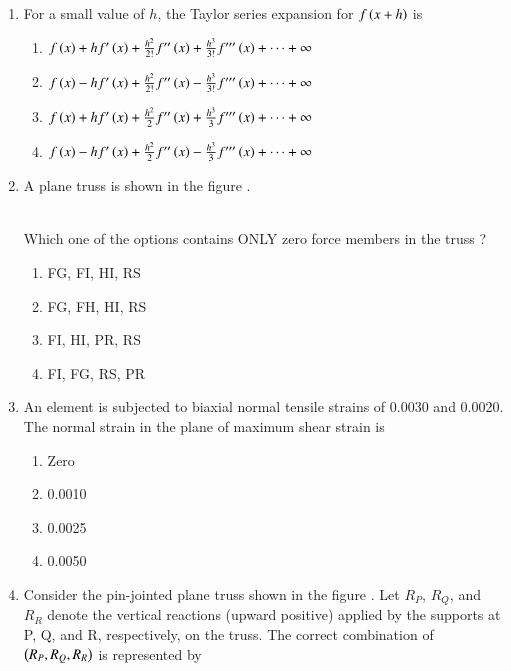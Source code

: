 \documentclass[journal]{IEEEtran}
\begin{document}
\begin{enumerate}
\item For a small value of $h$, the Taylor series expansion for $f\left(x+h\right)$ is
\begin{enumerate}
    \item $f\left(x\right) + hf'\left(x\right) + \frac{h^2}{2!}f''\left(x\right) + \frac{h^3}{3!}f'''\left(x\right) + \cdots + \infty$
    \item $f\left(x\right) - hf'\left(x\right) + \frac{h^2}{2!}f''\left(x\right) - \frac{h^3}{3!}f'''\left(x\right) + \cdots + \infty$
    \item $f\left(x\right) + hf'\left(x\right) + \frac{h^2}{2}f''\left(x\right) + \frac{h^3}{3}f'''\left(x\right) + \cdots + \infty$
    \item $f\left(x\right) - hf'\left(x\right) + \frac{h^2}{2}f''\left(x\right) - \frac{h^3}{3}f'''\left(x\right) + \cdots + \infty$ \\
\end{enumerate}
\item A plane truss is shown in the figure .
\begin{figure}[!ht]
\centering
\resizebox{1\textwidth}{!}{%

}%
\end{figure}\\
Which one of the options contains ONLY zero force members in the truss ?
\begin{enumerate}
    \item FG, FI, HI, RS
    \item FG, FH, HI, RS
    \item FI, HI, PR, RS
    \item FI, FG, RS, PR \\
\end{enumerate}
\item An element is subjected to biaxial normal tensile strains of 0.0030 and 0.0020. The normal strain in the plane of maximum shear strain is
\begin{enumerate}
    \item Zero
    \item 0.0010
    \item 0.0025
    \item 0.0050 \\
\end{enumerate}
\item Consider the pin-jointed plane truss shown in the figure . Let $R_P$, $R_Q$, and $R_R$ denote the vertical reactions (upward positive) applied by the supports at P, Q, and R, respectively, on the truss. The correct combination of $\left(R_P, R_Q, R_R\right)$ is represented by

\end{enumerate}
\end{document}
